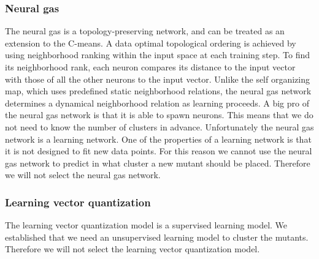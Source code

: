 \documentclass[../../main]{subfiles}
\begin{document}
\subsubsection{Neural gas}
The neural gas is a topology-preserving network, and can be treated as an extension to the C-means\cite{Du2010Clustering:Approach}.
A data optimal topological ordering is achieved by using neighborhood ranking within the input space at each training step\cite{Du2010Clustering:Approach}.
To find its neighborhood rank, each neuron compares its distance to the input vector with those of all the other neurons to the input vector\cite{Du2010Clustering:Approach}. 
Unlike the self organizing map, which uses predefined static neighborhood relations, the neural gas network determines a dynamical neighborhood relation as learning proceeds\cite{Du2010Clustering:Approach}.
A big pro of the neural gas network is that it is able to spawn neurons.
This means that we do not need to know the number of clusters in advance.
Unfortunately the neural gas network is a learning network.
One of the properties of a learning network is that it is not designed to fit new data points\cite{supervisedUnsupervised}.
For this reason we cannot use the neural gas network to predict in what cluster a new mutant should be placed.
Therefore we will not select the neural gas network.

\subsubsection{Learning vector quantization}
The learning vector quantization model is a supervised learning model.
We established that we need an unsupervised learning model to cluster the mutants.
Therefore we will not select the learning vector quantization model.
\end{document}
